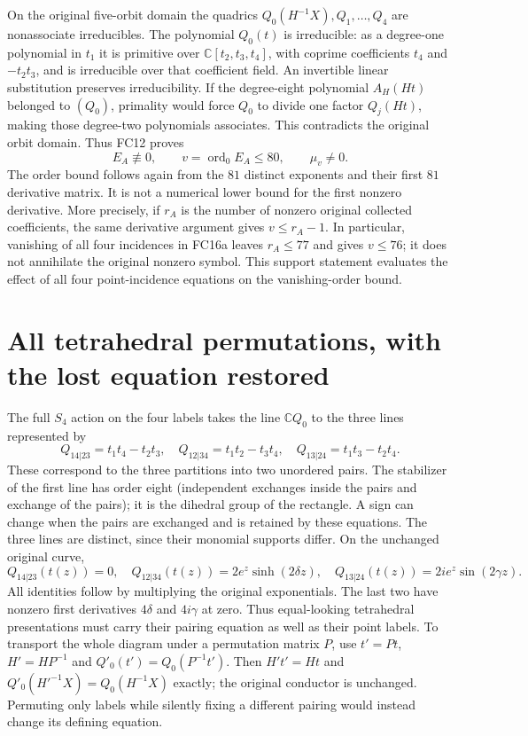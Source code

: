 \documentclass[11pt]{article}
\newcommand{\C}{\mathbb C}
\newcommand{\ord}{\operatorname{ord}}
\begin{document}
On the original five-orbit domain the quadrics $Q_0(H^{-1}X),Q_1,\ldots,Q_4$
are nonassociate irreducibles. The polynomial $Q_0(t)$ is irreducible:
as a degree-one polynomial in $t_1$ it is primitive over
$\C[t_2,t_3,t_4]$, with coprime coefficients $t_4$ and $-t_2t_3$,
and is irreducible over that coefficient field. An invertible linear
substitution preserves irreducibility. If the degree-eight polynomial
$A_H(Ht)$ belonged to $(Q_0)$, primality would force $Q_0$ to divide
one factor $Q_j(Ht)$, making those degree-two polynomials associates.
This contradicts the original orbit domain. Thus FC12 proves
\[
 E_A\not\equiv0,\qquad
 v=\ord_0E_A\le80,\qquad\mu_v\ne0.
 \tag{FC17}
\]
The order bound follows again from the $81$ distinct exponents and their
first $81$ derivative matrix. It is not a numerical lower bound for the
first nonzero derivative.
More precisely, if $r_A$ is the number of nonzero original collected
coefficients, the same derivative argument gives $v\le r_A-1$.
In particular, vanishing of all four incidences in FC16a leaves
$r_A\le77$ and gives $v\le76$; it does not annihilate the original
nonzero symbol. This support statement evaluates the effect of all four
point-incidence equations on the vanishing-order bound.

\section{All tetrahedral permutations, with the lost equation restored}
The full $S_4$ action on the four labels takes the line $\C Q_0$ to
the three lines represented by
\[
 Q_{14|23}=t_1t_4-t_2t_3,\quad
 Q_{12|34}=t_1t_2-t_3t_4,\quad
 Q_{13|24}=t_1t_3-t_2t_4.
 \tag{FC18}
\]
These correspond to the three partitions into two unordered pairs.
The stabilizer of the first line has order eight (independent exchanges
inside the pairs and exchange of the pairs); it is the dihedral group
of the rectangle. A sign can change when the pairs are exchanged and
is retained by these equations. The three lines are distinct, since
their monomial supports differ. On the unchanged original curve,
\[
 Q_{14|23}(t(z))=0,\quad
 Q_{12|34}(t(z))=2e^z\sinh(2\delta z),\quad
 Q_{13|24}(t(z))=2ie^z\sin(2\gamma z).
 \tag{FC19}
\]
All identities follow by multiplying the original exponentials. The
last two have nonzero first derivatives $4\delta$ and $4i\gamma$ at zero.
Thus equal-looking tetrahedral presentations must carry their pairing
equation as well as their point labels. To transport the whole diagram
under a permutation matrix $P$, use $t'=Pt$, $H'=HP^{-1}$ and
$Q'_0(t')=Q_0(P^{-1}t')$. Then $H't'=Ht$ and
$Q'_0(H'^{-1}X)=Q_0(H^{-1}X)$ exactly; the original conductor is unchanged.
Permuting only labels while silently fixing a different pairing would
instead change its defining equation.
\end{document}
